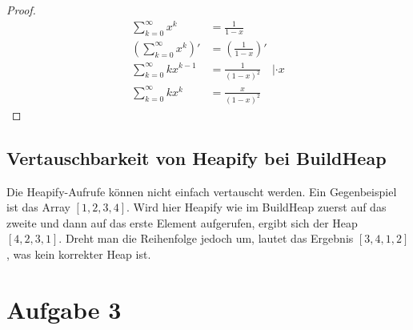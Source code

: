 \documentclass[a4paper]{article}
\begin{document}
    \begin{proof}
        \begin{align*}
            \sum_{k=0}^{\infty}{x^k} &= \frac{1}{1 - x} \\
            \left( \sum_{k=0}^{\infty}{x^k} \right)' &= \left( \frac{1}{1 - x} \right)' \\
            \sum_{k=0}^{\infty}{k x^{k-1}} &= \frac{1}{(1 - x)^2} \quad | \cdot x \\
            \sum_{k=0}^{\infty}{k x^k} &= \frac{x}{(1 - x)^2}
        \end{align*}
    \end{proof}

    \subsection*{Vertauschbarkeit von Heapify bei BuildHeap}
    Die Heapify-Aufrufe können nicht einfach vertauscht werden.
    Ein Gegenbeispiel ist das Array $[1, 2, 3, 4]$.
    Wird hier Heapify wie im BuildHeap zuerst auf das zweite und dann auf das erste Element aufgerufen, ergibt sich der Heap $[4, 2, 3, 1]$.
    Dreht man die Reihenfolge jedoch um, lautet das Ergebnis $[3, 4, 1, 2]$, was kein korrekter Heap ist.

    \section*{Aufgabe 3}
    \label{sec:aufgabe3}
\end{document}
